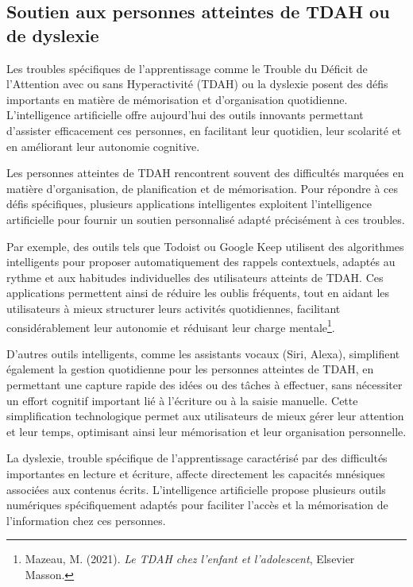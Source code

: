 \documentclass[12pt,a4paper]{report}
\begin{document}
\subsection{Soutien aux personnes atteintes de TDAH ou de dyslexie}

Les troubles spécifiques de l’apprentissage comme le Trouble du Déficit de l’Attention avec ou sans Hyperactivité (TDAH) ou la dyslexie posent des défis importants en matière de mémorisation et d’organisation quotidienne. L’intelligence artificielle offre aujourd’hui des outils innovants permettant d’assister efficacement ces personnes, en facilitant leur quotidien, leur scolarité et en améliorant leur autonomie cognitive.

Les personnes atteintes de TDAH rencontrent souvent des difficultés marquées en matière d’organisation, de planification et de mémorisation. Pour répondre à ces défis spécifiques, plusieurs applications intelligentes exploitent l’intelligence artificielle pour fournir un soutien personnalisé adapté précisément à ces troubles.

Par exemple, des outils tels que Todoist ou Google Keep utilisent des algorithmes intelligents pour proposer automatiquement des rappels contextuels, adaptés au rythme et aux habitudes individuelles des utilisateurs atteints de TDAH. Ces applications permettent ainsi de réduire les oublis fréquents, tout en aidant les utilisateurs à mieux structurer leurs activités quotidiennes, facilitant considérablement leur autonomie et réduisant leur charge mentale\footnote{Mazeau, M. (2021). \textit{Le TDAH chez l'enfant et l'adolescent}, Elsevier Masson.}.

D’autres outils intelligents, comme les assistants vocaux (Siri, Alexa), simplifient également la gestion quotidienne pour les personnes atteintes de TDAH, en permettant une capture rapide des idées ou des tâches à effectuer, sans nécessiter un effort cognitif important lié à l’écriture ou à la saisie manuelle. Cette simplification technologique permet aux utilisateurs de mieux gérer leur attention et leur temps, optimisant ainsi leur mémorisation et leur organisation personnelle.

La dyslexie, trouble spécifique de l’apprentissage caractérisé par des difficultés importantes en lecture et écriture, affecte directement les capacités mnésiques associées aux contenus écrits. L’intelligence artificielle propose plusieurs outils numériques spécifiquement adaptés pour faciliter l’accès et la mémorisation de l’information chez ces personnes.
\end{document}
